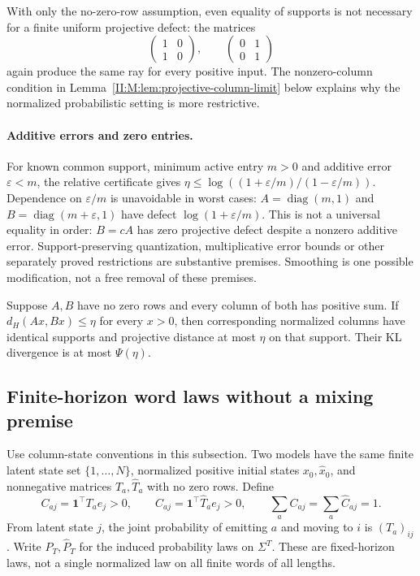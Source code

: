 With only the no-zero-row assumption, even equality of supports is
not necessary for a finite uniform projective defect: the matrices
\[
 \begin{pmatrix}1&0\\1&0\end{pmatrix},\qquad
 \begin{pmatrix}0&1\\0&1\end{pmatrix}
\]
again produce the same ray for every positive input. The nonzero-column
condition in Lemma~\ref{II:M:lem:projective-column-limit} below explains why
the normalized probabilistic setting is more restrictive.

\paragraph{Additive errors and zero entries.}
For known common support, minimum active entry $m>0$ and additive error
$\varepsilon<m$, the relative certificate gives
$\eta\le\log((1+\varepsilon/m)/(1-\varepsilon/m))$.
Dependence on $\varepsilon/m$ is unavoidable in worst cases:
$A=\operatorname{diag}(m,1)$ and
$B=\operatorname{diag}(m+\varepsilon,1)$ have defect
$\log(1+\varepsilon/m)$. This is not a universal equality in order:
$B=cA$ has zero projective defect despite a nonzero additive error.
Support-preserving quantization, multiplicative error bounds or other
separately proved restrictions are substantive premises. Smoothing is
one possible modification, not a free removal of these premises.

\begin{lemma}
\label{II:M:lem:projective-column-limit}
Suppose $A,B$ have no zero rows and every column of both has positive
sum. If $d_H(Ax,Bx)\le\eta$ for every $x>0$, then corresponding
normalized columns have identical supports and projective distance at
most $\eta$ on that support. Their KL divergence is at most $\Psi(\eta)$.
\end{lemma}


\subsection{Finite-horizon word laws without a mixing premise}
Use column-state conventions in this subsection. Two models have the
same finite latent state set $\{1,\ldots,N\}$, normalized positive
initial states $x_0,\widehat x_0$, and nonnegative matrices
$T_a,\widehat T_a$ with no zero rows. Define
\[
 C_{aj}=\mathbf1^\top T_a e_j>0,\qquad
 \widehat C_{aj}=\mathbf1^\top\widehat T_a e_j>0,
 \qquad \sum_a C_{aj}=\sum_a\widehat C_{aj}=1.
\]
From latent state $j$, the joint probability of emitting $a$ and moving
to $i$ is $(T_a)_{ij}$. Write $P_T,\widehat P_T$ for the induced
probability laws on $\Sigma^T$. These are fixed-horizon laws, not a
single normalized law on all finite words of all lengths.

